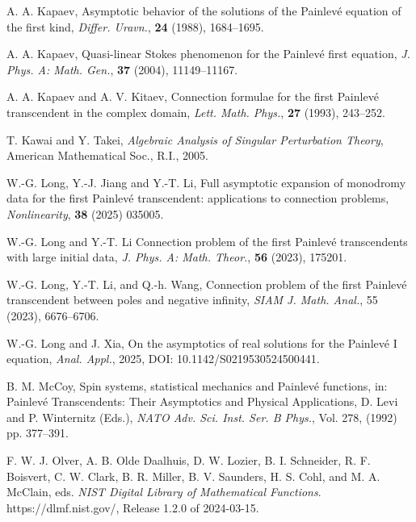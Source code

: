 \documentclass[12pt]{article}
\theoremstyle{plain}
\theoremstyle{definition}
\numberwithin{equation}{section}
\begin{document}
\begin{thebibliography}{}
{
A. A. Kapaev, Asymptotic behavior of the solutions of the Painlev\'{e} equation of the first kind, {\it Differ. Uravn.}, \textbf{24} (1988), 1684--1695.


A. A. Kapaev,
Quasi-linear Stokes phenomenon for the Painlev\'{e} first equation, {\it J. Phys. A: Math. Gen.}, \textbf{37} (2004), 11149--11167.

A. A. Kapaev and A. V. Kitaev, Connection formulae for the first Painlev\'{e} transcendent in the complex domain, {\it Lett. Math. Phys.}, \textbf{27} (1993), 243--252.






T. Kawai and Y. Takei, {\it Algebraic Analysis of Singular Perturbation Theory}, American Mathematical Soc., R.I., 2005.

%

W.-G. Long, Y.-J. Jiang and Y.-T. Li, Full asymptotic expansion of monodromy data for the first Painlev\'{e} transcendent: applications to connection problems, {\it Nonlinearity}, \textbf{38} (2025) 035005.



W.-G. Long and Y.-T. Li
Connection problem of the first Painlev\'{e} transcendents with large initial data,
\textit{J. Phys. A: Math. Theor.}, \textbf{56} (2023), 175201.

W.-G. Long, Y.-T. Li, and Q.-h. Wang,
Connection problem of the first Painlev\'e transcendent between poles and negative infinity,
\textit{SIAM J. Math. Anal.}, 55 (2023), 6676--6706.

W.-G. Long and J. Xia, On the asymptotics of real solutions
for the Painlev\'{e} I equation, {\it Anal. Appl.}, 2025, DOI: 10.1142/S0219530524500441.


B. M. McCoy,
Spin systems, statistical mechanics and Painlev\'e functions,
in: Painlev\'e Transcendents: Their Asymptotics and Physical Applications,
D. Levi and P. Winternitz (Eds.),
\textit{NATO Adv. Sci. Inst. Ser. B Phys.}, Vol. 278, (1992) pp. 377--391.


F. W. J. Olver, A. B. Olde Daalhuis, D. W. Lozier, B. I. Schneider, R. F. Boisvert, C. W. Clark, B. R. Miller, B. V. Saunders, H. S. Cohl, and M. A. McClain, eds.
\textit{NIST Digital Library of Mathematical Functions}. https://dlmf.nist.gov/, Release 1.2.0 of 2024-03-15.

}
\end{thebibliography}
\end{document}
